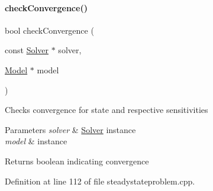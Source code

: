 \paragraph{\texorpdfstring{checkConvergence()}{checkConvergence()}}
{\footnotesize\ttfamily bool check\+Convergence (\begin{DoxyParamCaption}\item[{const \mbox{\hyperlink{classamici_1_1_solver}{Solver}} $\ast$}]{solver,  }\item[{\mbox{\hyperlink{classamici_1_1_model}{Model}} $\ast$}]{model }\end{DoxyParamCaption})}

Checks convergence for state and respective sensitivities


\begin{DoxyParams}{Parameters}
{\em solver} & \mbox{\hyperlink{classamici_1_1_solver}{Solver}} instance \\
\hline
{\em model} & instance \\
\hline
\end{DoxyParams}
\begin{DoxyReturn}{Returns}
boolean indicating convergence 
\end{DoxyReturn}


Definition at line 112 of file steadystateproblem.\+cpp.

